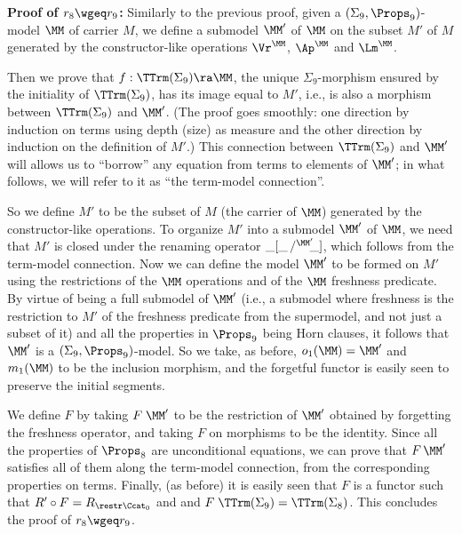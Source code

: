 		\textbf{Proof of $r_8\wgeq r_9$:}  
		Similarly to the previous proof, 
		given a $(\Sigma_{9},\Props_{9})$-model $\MM$ of carrier $M$, we 
		define a submodel $\MM'$ of $\MM$ on the subset $M'$ of $M$ generated by the constructor-like operations $\Vr^\MM$, $\Ap^\MM$ and $\Lm^\MM$. 
		
		Then we prove that $f: \TTrm(\Sigma_{9}) \ra \MM$, the unique $\Sigma_{9}$-morphism ensured by the initiality of  
		$\TTrm(\Sigma_{9})$, has its image equal to $M'$, i.e., is also a morphism between $\TTrm(\Sigma_{9})$ and $\MM'$. (The proof goes smoothly: one direction by induction on terms using depth (size) as measure and the other direction by induction on the definition of $M'$.) This connection between $\TTrm(\Sigma_{9})$ and $\MM'$ will allows us to ``borrow'' any equation from terms to elements of $\MM'$; in what follows, we will refer to it as ``the term-model connection''. 
		
		So we define $M'$ to be the subset of $M$ (the carrier of $\MM$) generated by the constructor-like operations. 
		To organize $M'$ into a submodel $\MM'$ of $\MM$, we need that $M'$ is closed under the renaming operator $\_[\_\,/^{\MM'}\!\!\_]$, which follows from the term-model connection. Now we can define the model $\MM'$ to be formed on $M'$ using the restrictions of the $\MM$ operations and of the $\MM$ freshness predicate. 
		By virtue of being a full submodel of $\MM'$ (i.e., a submodel where freshness is the restriction to $M'$ of 
		the freshness predicate from the supermodel, and not just a subset of it)
		and all the properties in  $\Props_{9}$ being Horn clauses, it follows that $\MM'$ is a $(\Sigma_{9},\Props_{9})$-model. So we take, as before, $o_1(\MM) = \MM'$ and $m_1(\MM)$ to be the inclusion morphism, and the forgetful functor is easily seen to preserve the initial segments. 
		
		We define $F$ by taking $F\;\MM'$ to be the restriction of $\MM'$ obtained by forgetting the freshness operator, and taking $F$ on morphisms to be the identity. Since all the properties of $\Props_8$ are unconditional equations, we can prove that $F\,\MM'$ satisfies all of them along the term-model connection, from the corresponding properties on terms. 
		Finally, (as before) it is easily seen that $F$ is a functor such that $R' \circ F = R_{\restr\Ccat_0}$ and 
		and 
		$F\;\TTrm(\Sigma_{9}) = \TTrm(\Sigma_8)$. 
		This concludes the proof of $r_8 \wgeq r_9$.  
		
